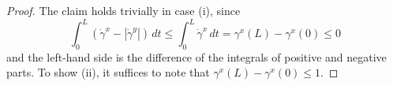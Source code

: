\documentclass[11pt,a4paper]{amsart}
\theoremstyle{definition}
\begin{document}
\begin{proof}
The claim holds trivially in case (i), since
$$\int_0^L(\dot\gamma^x-|\dot\gamma^y|)\,dt\le\int_0^L\dot\gamma^x\,dt
=\gamma^x(L)-\gamma^x(0)\le0$$
and the left-hand side is the difference of the integrals of positive and negative parts.
To show (ii), it suffices to note that $\gamma^x(L)-\gamma^x(0)\le1$.
%
%
\end{proof}
\end{document}
